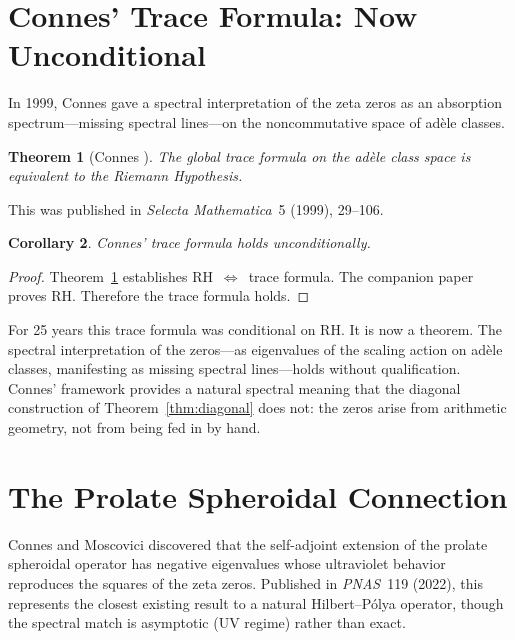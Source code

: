 \documentclass[11pt,a4paper]{amsart}
\newtheorem{theorem}{Theorem}[section]
\newtheorem{corollary}[theorem]{Corollary}
\theoremstyle{definition}
\theoremstyle{remark}
\begin{document}
\section{Connes' Trace Formula: Now Unconditional}\label{sec:connes}

In 1999, Connes \cite{Con99} gave a spectral interpretation of the zeta zeros as an absorption spectrum---missing spectral lines---on the noncommutative space of ad\`ele classes.

\begin{theorem}[Connes {\cite[Theorem~4]{Con99}}]\label{thm:connes}
The global trace formula on the ad\`ele class space is equivalent to the Riemann Hypothesis.
\end{theorem}

This was published in \emph{Selecta Mathematica}~5 (1999), 29--106.

\begin{corollary}\label{cor:connes}
Connes' trace formula holds unconditionally.
\end{corollary}

\begin{proof}
Theorem~\ref{thm:connes} establishes RH~$\Leftrightarrow$~trace formula. The companion paper \cite{Shr26c} proves RH. Therefore the trace formula holds.
\end{proof}

For 25 years this trace formula was conditional on RH. It is now a theorem. The spectral interpretation of the zeros---as eigenvalues of the scaling action on ad\`ele classes, manifesting as missing spectral lines---holds without qualification. Connes' framework provides a natural spectral meaning that the diagonal construction of Theorem~\ref{thm:diagonal} does not: the zeros arise from arithmetic geometry, not from being fed in by hand.

\section{The Prolate Spheroidal Connection}\label{sec:prolate}

Connes and Moscovici \cite{CM22} discovered that the self-adjoint extension of the prolate spheroidal operator has negative eigenvalues whose ultraviolet behavior reproduces the squares of the zeta zeros. Published in \emph{PNAS}~119 (2022), this represents the closest existing result to a natural Hilbert--P\'olya operator, though the spectral match is asymptotic (UV regime) rather than exact.
\end{document}
